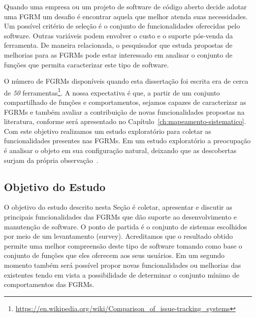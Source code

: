 Quando uma empresa ou um projeto de software de código aberto decide adotar uma
FGRM um desafio é encontrar aquela que melhor atenda suas necessidades. Um
possível critério de seleção é o conjunto de funcionalidades oferecidas pelo
software. Outras variáveis podem envolver o custo e o suporte pós-venda da
ferramenta. De maneira relacionada, o pesquisador que estuda propostas de
melhorias para as FGRMs pode estar interessado em analisar o conjunto de funções
que permita caracterizar este tipo de software.

O número de FGRMs disponíveis quando esta dissertação foi escrita era de cerca
de \textit{50}
ferramentas\footnote{\url{https://en.wikipedia.org/wiki/Comparison_of_issue-tracking_systems}}.
A nossa expectativa é que, a partir de um conjunto compartilhado de funções e
comportamentos, sejamos capazes de caracterizar as FGRMs e também avaliar a
contribuição de novas funcionalidades propostas na li\-te\-ra\-tu\-ra, conforme
será apresentado no Capítulo~\ref{ch:mapeamento-sistematico}. Com este objetivo
realizamos um estudo exploratório para coletar as funcionalidades presentes nas
FGRMs. Em um estudo exploratório a preocupação é analisar o objeto em sua
configuração natural, deixando que as descobertas surjam da própria
observação~\cite{wohlin2012experimentation}.


\subsection{Objetivo do Estudo}
\label{subsec:caracterizacao_objetivo_do_capitulo}

O objetivo do estudo descrito nesta Seção é coletar, apresentar e discutir as
principais funcionalidades das FGRMs que dão suporte ao desenvolvimento e
manutenção de software. O ponto de partida é o conjunto de sistemas escolhidos
por meio de um levantamento (survey). Acreditamos que o resultado obtido permite
uma melhor compreensão deste tipo de software tomando como base o conjunto de
funções que eles oferecem aos seus usuários. Em um segundo momento também será
possível propor novas funcionalidades ou melhorias das existentes tendo em vista
a possibilidade de determinar o conjunto mínimo de comportamentos das FGRMs.

